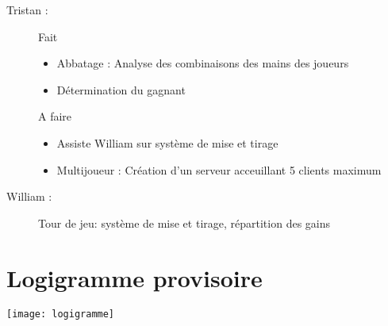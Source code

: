 \documentclass[12pt,a4paper]{article}
\begin{document}
\begin{description}
\item[Tristan :]
{
Fait
\begin{itemize}
    \item Abbatage : Analyse des combinaisons des mains des joueurs
    \item Détermination du gagnant
\end{itemize}
A faire
\begin{itemize}
    \item Assiste William sur système de mise et tirage
    \item Multijoueur : Création d'un serveur acceuillant 5 clients maximum
\end{itemize}
}
\item[William :]{Tour de jeu: système de mise et tirage, répartition des gains}

\end{description}

\section{Logigramme provisoire}
\texttt{[image: logigramme]}
\end{document}
